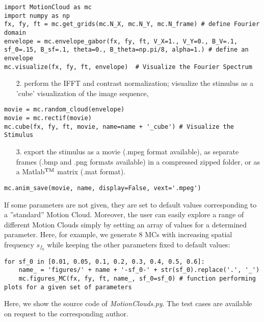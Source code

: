 \documentclass[a4paper,11pt]{article}%
\begin{document}
\begin{lstlisting}
import MotionCloud as mc
import numpy as np
fx, fy, ft = mc.get_grids(mc.N_X, mc.N_Y, mc.N_frame) # define Fourier domain
envelope = mc.envelope_gabor(fx, fy, ft, V_X=1., V_Y=0., B_V=.1, sf_0=.15, B_sf=.1, theta=0., B_theta=np.pi/8, alpha=1.) # define an envelope
mc.visualize(fx, fy, ft, envelope)  # Visualize the Fourier Spectrum
\end{lstlisting}

\begin{enumerate}	
\item[2.] perform the IFFT and contrast normalization; visualize the stimulus as a 'cube' visualization of the image sequence,
\end{enumerate}

\begin{lstlisting}
movie = mc.random_cloud(envelope)
movie = mc.rectif(movie)
mc.cube(fx, fy, ft, movie, name=name + '_cube') # Visualize the Stimulus
\end{lstlisting} 

\begin{enumerate}
\item[3.] export the stimulus as a movie (.mpeg format available), as separate frames (.bmp and .png formats available) in a compressed zipped folder, or as a Matlab$^{\rm TM}$ matrix (.mat format). 
\end{enumerate}

\begin{lstlisting}
mc.anim_save(movie, name, display=False, vext='.mpeg')
\end{lstlisting}

If some parameters are not given, they are set to default values corresponding to a ''standard'' Motion Cloud. Moreover, the user can easily explore a range of different Motion Clouds simply by setting  an array of values for a determined parameter. Here, for example, we generate 8 MCs with increasing spatial frequency $s_{f_0}$ while keeping the other parameters fixed to default values:
%
\begin{lstlisting}
for sf_0 in [0.01, 0.05, 0.1, 0.2, 0.3, 0.4, 0.5, 0.6]:
	name_ = 'figures/' + name + '-sf_0-' + str(sf_0).replace('.', '_')
	mc.figures_MC(fx, fy, ft, name_, sf_0=sf_0) # function performing plots for a given set of parameters
\end{lstlisting}

Here, we show the source code of \textit{MotionClouds.py}. The test cases are available on request to the corresponding author. 
\end{document}
